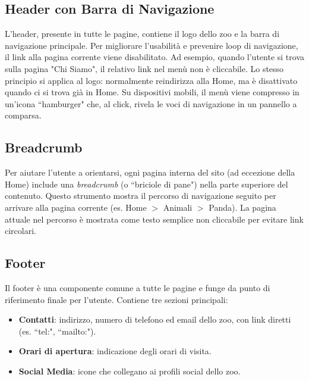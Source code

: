 \subsection{Header con Barra di Navigazione}
L'header, presente in tutte le pagine, contiene il logo dello zoo e la barra di navigazione principale. Per migliorare l'usabilità e prevenire loop di navigazione, il link alla pagina corrente viene disabilitato. Ad esempio, quando l'utente si trova sulla pagina "Chi Siamo", il relativo link nel menù non è cliccabile. Lo stesso principio si applica al logo: normalmente reindirizza alla Home, ma è disattivato quando ci si trova già in Home.
Su dispositivi mobili, il menù viene compresso in un'icona ``hamburger" che, al click, rivela le voci di navigazione in un pannello a comparsa.

\subsection{Breadcrumb}
Per aiutare l'utente a orientarsi, ogni pagina interna del sito (ad eccezione della Home) include una \textit{breadcrumb} (o ``briciole di pane") nella parte superiore del contenuto. Questo strumento mostra il percorso di navigazione seguito per arrivare alla pagina corrente (es. Home $>$ Animali $>$ Panda). La pagina attuale nel percorso è mostrata come testo semplice non cliccabile per evitare link circolari.

\subsection{Footer}
Il footer è una componente comune a tutte le pagine e funge da punto di riferimento finale per l'utente. Contiene tre sezioni principali:
\begin{itemize}
    \item \textbf{Contatti}: indirizzo, numero di telefono ed email dello zoo, con link diretti (es. ``tel:", ``mailto:").
    \item \textbf{Orari di apertura}: indicazione degli orari di visita.
    \item \textbf{Social Media}: icone che collegano ai profili social dello zoo.
\end{itemize}
